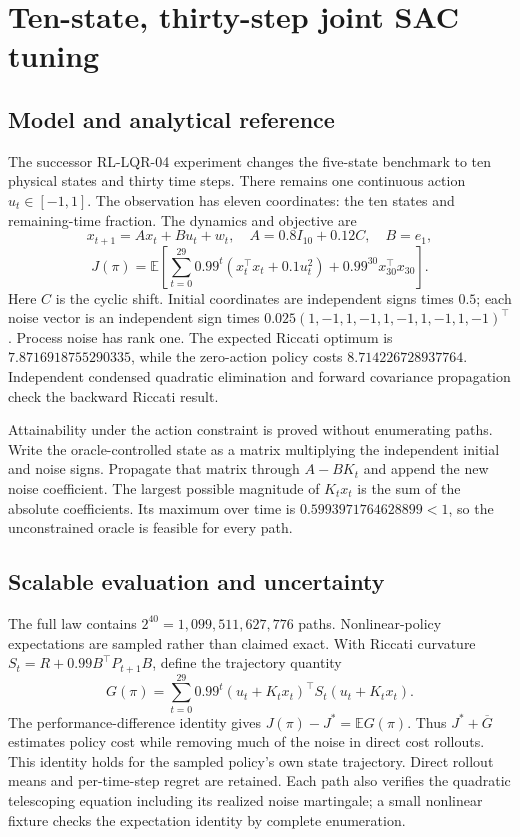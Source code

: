 \chapter{Ten-state, thirty-step joint SAC tuning}
\label{sec:lqr10-h30}

\section{Model and analytical reference}
The successor RL-LQR-04 experiment changes the five-state benchmark to ten
physical states and thirty time steps. There remains one continuous action
$u_t\in[-1,1]$. The observation has eleven coordinates: the ten states and
remaining-time fraction. The dynamics and objective are
\[
 x_{t+1}=Ax_t+Bu_t+w_t,\quad A=0.8I_{10}+0.12C,\quad B=e_1,
\]
\[
 J(\pi)=\mathbb{E}\!\left[\sum_{t=0}^{29}0.99^t
 (x_t^\top x_t+0.1u_t^2)+0.99^{30}x_{30}^\top x_{30}\right].
\]
Here $C$ is the cyclic shift. Initial coordinates are independent signs times
$0.5$; each noise vector is an independent sign times
$0.025(1,-1,1,-1,1,-1,1,-1,1,-1)^\top$. Process noise has rank one.
The expected Riccati optimum is $7.8716918755290335$, while the zero-action
policy costs $8.714226728937764$. Independent condensed quadratic elimination
and forward covariance propagation check the backward Riccati result.

Attainability under the action constraint is proved without enumerating paths.
Write the oracle-controlled state as a matrix multiplying the independent
initial and noise signs. Propagate that matrix through $A-BK_t$ and append
the new noise coefficient. The largest possible magnitude of $K_tx_t$ is the
sum of the absolute coefficients. Its maximum over time is
$0.5993971764628899<1$, so the unconstrained oracle is feasible for every path.

\section{Scalable evaluation and uncertainty}
The full law contains $2^{40}=1{,}099{,}511{,}627{,}776$ paths. Nonlinear-policy
expectations are sampled rather than claimed exact. With Riccati curvature
$S_t=R+0.99B^\top P_{t+1}B$, define the trajectory quantity
\[
 G(\pi)=\sum_{t=0}^{29}0.99^t
 (u_t+K_tx_t)^\top S_t(u_t+K_tx_t).
\]
The performance-difference identity gives $J(\pi)-J^*=\mathbb{E}G(\pi)$.
Thus $J^*+\overline G$ estimates policy cost while removing much of the noise
in direct cost rollouts. This identity holds for the sampled policy's own
state trajectory. Direct rollout means and per-time-step regret are retained.
Each path also verifies the quadratic telescoping equation including its
realized noise martingale; a small nonlinear fixture checks the expectation
identity by complete enumeration.


